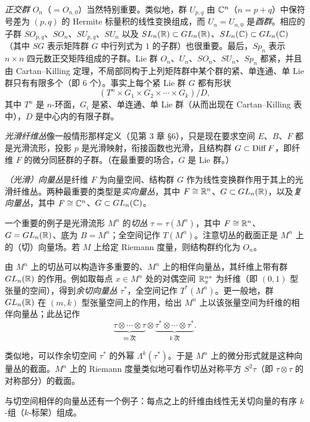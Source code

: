\emph{正交群} $O_n$（$=O_{n,0}$）当然特别重要。类似地，群 $U_{p,q}$ 由 $\mathbb{C}^n$（$n=p+q$）中保符号差为 $(p,q)$ 的 Hermite 标量积的线性变换组成，而 $U_n=U_{n,0}$ 是\emph{酉群}。相应的子群 $SO_{p,q}$、$SO_n$、$SU_{p,q}$、$SU_n$ 以及 $SL_n(\mathbb{R})\subset GL_n(\mathbb{R})$、$SL_n(\mathbb{C})\subset GL_n(\mathbb{C})$（其中 $SG$ 表示矩阵群 $G$ 中行列式为 $1$ 的子群）也很重要。最后，$Sp_n$ 表示 $n\times n$ 四元数正交矩阵组成的子群。Lie 群 $O_n$、$U_n$、$SO_n$、$SU_n$、$Sp_n$ 都紧，并且由 Cartan--Killing 定理，不局部同构于上列矩阵群中某个群的紧、单连通、单 Lie 群只有有限多个（即 $6$ 个）。事实上每个紧 Lie 群 $G$ 都有形状
\[
(T^n\times G_1\times G_2\times\cdots\times G_k)/D,
\]
其中 $T^n$ 是 $n$-环面，$G_i$ 是紧、单连通、单 Lie 群（从而出现在 Cartan--Killing 表中），$D$ 是中心内的有限子群。

\emph{光滑纤维丛}像一般情形那样定义（见第 3 章 §6），只是现在要求空间 $E$、$B$、$F$ 都是光滑流形，投影 $p$ 是光滑映射，衔接函数也光滑，且结构群 $G\subset\operatorname{Diff} F$，即纤维 $F$ 的微分同胚群的子群。（在最重要的场合，$G$ 是 Lie 群。）

\emph{（光滑）向量丛}是纤维 $F$ 为向量空间、结构群 $G$ 作为线性变换群作用于其上的光滑纤维丛。两种最重要的类型是\emph{实向量丛}，其中 $F\cong\mathbb{R}^n$、$G\subset GL_n(\mathbb{R})$，以及\emph{复向量丛}，其中 $F\cong\mathbb{C}^n$、$G\subset GL_n(\mathbb{C})$。

一个重要的例子是光滑流形 $M^n$ 的\emph{切丛} $\tau=\tau(M^n)$，其中 $F\cong\mathbb{R}^n$、$G=GL_n(\mathbb{R})$、底为 $B=M^n$；全空间记作 $T(M^n)$。注意切丛的截面正是 $M^n$ 上的（切）向量场。若 $M$ 上给定 Riemann 度量，则结构群约化为 $O_n$。

由 $M^n$ 上的切丛可以构造许多重要的、$M^n$ 上的相伴向量丛，其纤维上带有群 $GL_n(\mathbb{R})$ 的作用。例如取每点 $x\in M^n$ 处的对偶空间 $\mathbb{R}_x^{n*}$ 为纤维（即 $(0,1)$ 型张量的空间），得到\emph{余切向量丛} $\tau^*$，全空间记作 $T^*(M^n)$。更一般地，群 $GL_n(\mathbb{R})$ 在 $(m,k)$ 型张量空间上的作用，给出 $M^n$ 上以该张量空间为纤维的相伴向量丛；此丛记作
\[
\underbrace{\tau\otimes\cdots\otimes\tau}_{m\ \text{次}}\otimes\underbrace{\tau^*\otimes\cdots\otimes\tau^*}_{k\ \text{次}}.
\]

类似地，可以作余切空间 $\tau^*$ 的外幂 $\Lambda^k(\tau^*)$。于是 $M^n$ 上的微分形式就是这种向量丛的截面。$M^n$ 上的 Riemann 度量类似地可看作切丛对称平方 $S^2\tau$（即 $\tau\otimes\tau$ 的对称部分）的截面。

与切空间相伴的向量丛还有一个例子：每点之上的纤维由线性无关切向量的有序 $k$-组（$k$-标架）组成。

